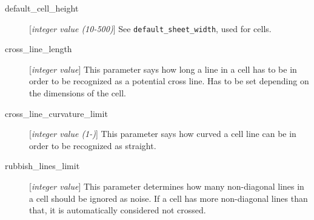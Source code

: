 \documentclass{article}
\begin{document}
{{\begin{description}
				\item [default\_cell\_height] [{\it integer value (10-500)}] See \verb+default_sheet_width+, used for cells.
				\item [cross\_line\_length] [{\it integer value}] This parameter says how long a line in a cell has to be in order to be recognized as a potential cross line. Has to be set depending on the dimensions of the cell.
				\item [cross\_line\_curvature\_limit] [{\it integer value (1-)}] This parameter says how curved a cell line can be in order to be recognized as straight.
				\item [rubbish\_lines\_limit] [{\it integer value}] This parameter determines how many non-diagonal lines in a cell should be ignored as noise. If a cell has more non-diagonal lines than that, it is automatically considered not crossed.
			\end{description}
		}
	
}
\end{document}
